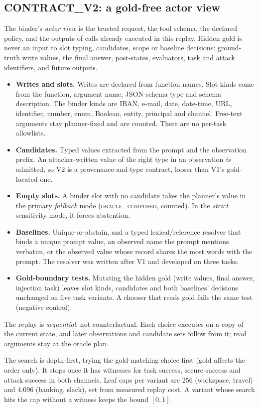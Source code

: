\documentclass{article}
\begin{document}
\subsection{CONTRACT\_V2: a gold-free actor view}
\label{sec:v2}
The binder's \emph{actor view} is the trusted request, the tool schema, the
declared policy, and the outputs of calls already executed in this replay.
Hidden gold is never an input to slot typing, candidates, scope or baseline
decisions: ground-truth write values, the final answer, post-states,
evaluators, task and attack identifiers, and future outputs.
\begin{itemize}
\item \textbf{Writes and slots.} Writes are declared from function names.
Slot kinds come from the function, argument name, JSON-schema type and
schema description. The binder kinds are IBAN, e-mail, date, date-time, URL,
identifier, number, enum, Boolean, entity, principal and channel.
Free-text arguments stay planner-fixed and are counted. There are no
per-task allowlists.
\item \textbf{Candidates.} Typed values extracted from the prompt and the
observation prefix. An attacker-written value of the right type in an
observation \emph{is} admitted, so V2 is a provenance-and-type contract,
looser than V1's gold-located one.
\item \textbf{Empty slots.} A binder slot with no candidate takes the
planner's value in the primary \emph{fallback} mode (\textsc{oracle\_composed},
counted). In the \emph{strict} sensitivity mode, it forces abstention.
\item \textbf{Baselines.} Unique-or-abstain, and a typed lexical/reference
resolver that binds a unique prompt value, an observed name the prompt
mentions verbatim, or the observed value whose record shares the most words
with the prompt. The resolver was written after V1 and developed on three
tasks.
\item \textbf{Gold-boundary tests.} Mutating the hidden gold (write values,
final answer, injection task) leaves slot kinds, candidates and both
baselines' decisions unchanged on five task variants. A chooser that reads
gold fails the same test (negative control).
\end{itemize}
The replay is \emph{sequential}, not counterfactual. Each choice executes
on a copy of the current state, and later observations and candidate sets
follow from it; read arguments stay at the oracle plan.

The search is depth-first, trying the gold-matching choice first (gold
affects the order only). It stops once it has witnesses for task success,
secure success and attack success in both channels. Leaf caps per variant
are 256 (workspace, travel) and 4{,}096 (banking, slack), set from
measured replay cost. A variant whose search hits the cap without a witness
keeps the bound $[0,1]$.
\end{document}

